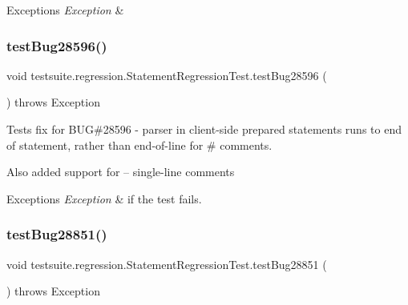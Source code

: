 \begin{DoxyExceptions}{Exceptions}
{\em Exception} & \\
\hline
\end{DoxyExceptions}
\mbox{\label{classtestsuite_1_1regression_1_1_statement_regression_test_a1d616199f65aad8a199b762687ef4880}} 
\subsubsection{\texorpdfstring{test\+Bug28596()}{testBug28596()}}
{\footnotesize\ttfamily void testsuite.\+regression.\+Statement\+Regression\+Test.\+test\+Bug28596 (\begin{DoxyParamCaption}{ }\end{DoxyParamCaption}) throws Exception}

Tests fix for B\+UG\#28596 -\/ parser in client-\/side prepared statements runs to end of statement, rather than end-\/of-\/line for \textquotesingle{}\#\textquotesingle{} comments.

Also added support for \textquotesingle{}--\textquotesingle{} single-\/line comments


\begin{DoxyExceptions}{Exceptions}
{\em Exception} & if the test fails. \\
\hline
\end{DoxyExceptions}
\mbox{\label{classtestsuite_1_1regression_1_1_statement_regression_test_a466a50de4804c830422e6b7e6a9c9653}} 
\subsubsection{\texorpdfstring{test\+Bug28851()}{testBug28851()}}
{\footnotesize\ttfamily void testsuite.\+regression.\+Statement\+Regression\+Test.\+test\+Bug28851 (\begin{DoxyParamCaption}{ }\end{DoxyParamCaption}) throws Exception}

